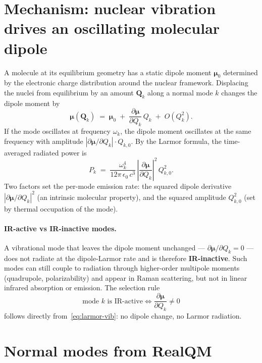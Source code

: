 \section{Mechanism: nuclear vibration drives an oscillating molecular dipole}\label{sec:molrad-mechanism}

A molecule at its equilibrium geometry has a static dipole moment $\boldsymbol{\mu}_0$ determined by the electronic charge distribution around the nuclear framework. Displacing the nuclei from equilibrium by an amount $\mathbf{Q}_k$ along a normal mode $k$ changes the dipole moment by
\begin{equation}\label{eq:dipole-derivative}
\boldsymbol{\mu}(\mathbf{Q}_k) \;=\; \boldsymbol{\mu}_0 \;+\; \frac{\partial \boldsymbol{\mu}}{\partial Q_k}\, Q_k \;+\; O(Q_k^2).
\end{equation}
If the mode oscillates at frequency $\omega_k$, the dipole moment oscillates at the same frequency with amplitude $|\partial\boldsymbol{\mu}/\partial Q_k| \cdot Q_{k,0}$. By the Larmor formula, the time-averaged radiated power is
\begin{equation}\label{eq:larmor-vib}
P_k \;=\; \frac{\omega_k^4}{12\pi\,\epsilon_0\, c^3}\,\left|\frac{\partial \boldsymbol{\mu}}{\partial Q_k}\right|^2\, Q_{k,0}^2.
\end{equation}
Two factors set the per-mode emission rate: the squared dipole derivative $|\partial\boldsymbol{\mu}/\partial Q_k|^2$ (an intrinsic molecular property), and the squared amplitude $Q_{k,0}^2$ (set by thermal occupation of the mode).

\paragraph{IR-active vs IR-inactive modes.}
A vibrational mode that leaves the dipole moment unchanged --- $\partial\boldsymbol{\mu}/\partial Q_k = 0$ --- does not radiate at the dipole-Larmor rate and is therefore \textbf{IR-inactive}. Such modes can still couple to radiation through higher-order multipole moments (quadrupole, polarizability) and appear in Raman scattering, but not in linear infrared absorption or emission. The selection rule
\begin{equation}\label{eq:ir-selection}
\text{mode } k \text{ is IR-active} \iff \frac{\partial \boldsymbol{\mu}}{\partial Q_k} \neq 0
\end{equation}
follows directly from~\eqref{eq:larmor-vib}: no dipole change, no Larmor radiation.

\section{Normal modes from RealQM}\label{sec:molrad-normal-modes}

